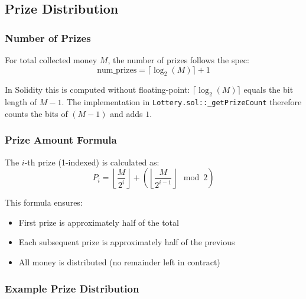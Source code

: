 \documentclass[12pt,a4paper]{article}
\begin{document}
\subsection{Prize Distribution}

\subsubsection{Number of Prizes}

For total collected money $M$, the number of prizes follows the spec:
\begin{equation}
    \text{num\_prizes} = \lceil \log_2(M) \rceil + 1
\end{equation}

In Solidity this is computed without floating-point: $\lceil \log_2(M) \rceil$
equals the bit length of $M-1$. The implementation in
\texttt{Lottery.sol::\_getPrizeCount} therefore counts the bits of $(M-1)$
and adds $1$.

\subsubsection{Prize Amount Formula}

The $i$-th prize (1-indexed) is calculated as:
\begin{equation}
    P_i = \left\lfloor \frac{M}{2^i} \right\rfloor + \left( \left\lfloor \frac{M}{2^{i-1}} \right\rfloor \mod 2 \right)
\end{equation}

This formula ensures:
\begin{itemize}
    \item First prize is approximately half of the total
    \item Each subsequent prize is approximately half of the previous
    \item All money is distributed (no remainder left in contract)
\end{itemize}

\subsubsection{Example Prize Distribution}
\end{document}
